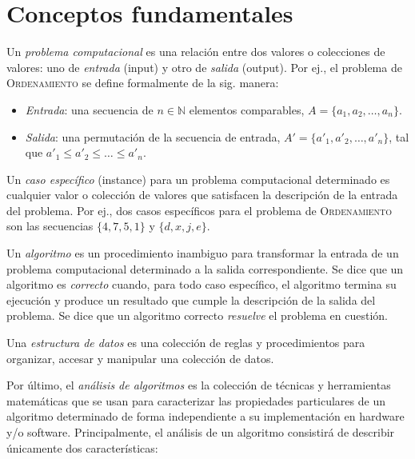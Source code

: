 \chapter{Conceptos fundamentales}

Un \emph{problema computacional} es una relación entre dos valores o colecciones de valores: uno de \emph{entrada} (input) y otro de \emph{salida} (output). Por ej., el problema de \textsc{Ordenamiento} se define formalmente de la sig. manera:
\begin{itemize}
  \item \emph{Entrada}: una secuencia de \(n\in\mathbb{N}\) elementos comparables, \(A=\{a_1,a_2,\dots,a_n\}\).
  \item \emph{Salida}: una permutación de la secuencia de entrada, \(A'=\{a'_1,a'_2,\dots,a'_n\}\), tal que \(a'_1\leq a'_2\leq\dots\leq a'_n\).
\end{itemize}
Un \emph{caso específico} (instance) para un problema computacional determinado es cualquier valor o colección de valores que satisfacen la descripción de la entrada del problema. 
Por ej., dos casos específicos para el problema de \textsc{Ordenamiento} son las secuencias \(\{4,7,5,1\}\) y \(\{d,x,j,e\}\).

Un \emph{algoritmo} es un procedimiento inambiguo para transformar la entrada de un problema computacional determinado a la salida correspondiente.
Se dice que un algoritmo es \emph{correcto} cuando, para todo caso específico, el algoritmo termina su ejecución y produce un resultado que cumple la descripción de la salida del problema.
Se dice que un algoritmo correcto \emph{resuelve} el problema en cuestión.

Una \emph{estructura de datos} es una colección de reglas y procedimientos para organizar, accesar y manipular una colección de datos.


Por último, el \emph{análisis de algoritmos} es la colección de técnicas y herramientas matemáticas que se usan para caracterizar las propiedades particulares de un algoritmo determinado de forma independiente a su implementación en hardware y/o software. 
Principalmente, el análisis de un algoritmo consistirá de describir únicamente dos características:

